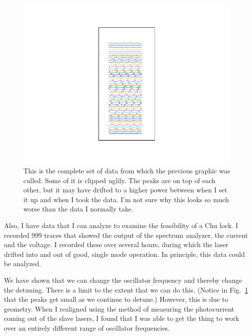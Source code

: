 \begin{figure}
\centerline{\includegraphics{all_splittingData}}
\caption[]{\label{fig:alldata} 
This is the complete set of data from which the previous graphic was culled. Some of it is clipped uglily. The peaks are on top of each other, but it may have drifted to a higher power between when I set it up and when I took the data. I'm not sure why this looks so much worse than the data I normally take.}
\end{figure}

Also, I have data that I can analyze to examine the feasibility of a Chu lock. I recorded 999 traces that showed the output of the spectrum analyzer, the current and the voltage. I recorded these over several hours, during which the laser drifted into and out of good, single mode operation. In principle, this data could be analyzed. 

We have shown that we can change the oscillator frequency and thereby change the detuning. There is a limit to the extent that we can do this. (Notice in Fig.\ \ref{fig:alldata} that the peaks get small as we continue to detune.) However, this is due to geometry. When I realigned using the method of measuring the photocurrent coming out of the slave lasers, I found that I was able to get the thing to work over an entirely different range of oscillator frequencies. 

